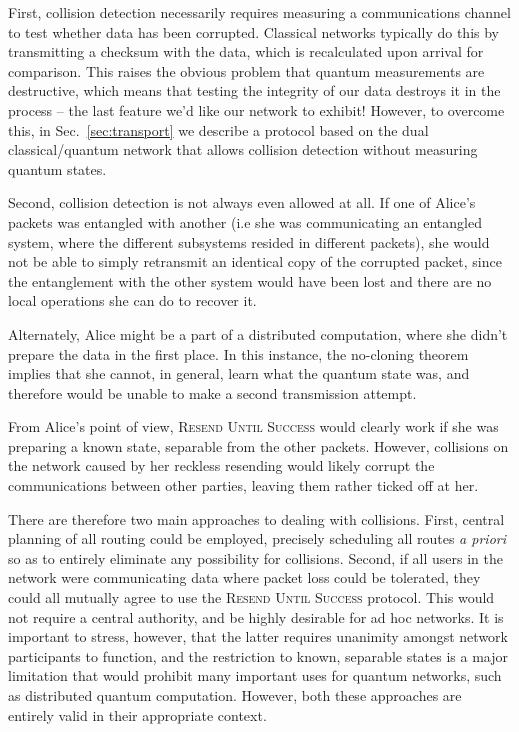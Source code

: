 \documentclass[aps, rmp, twocolumn, amsmath, amssymb, nofootinbib, superscriptaddress, longbibliography, floatfix, table-of-contents, eqsecnum]{revtex4-1}
\begin{document}
First, collision detection necessarily requires measuring a communications channel to test whether data has been corrupted. Classical networks typically do this by transmitting a checksum with the data, which is recalculated upon arrival for comparison. This raises the obvious problem that quantum measurements are destructive, which means that testing the integrity of our data destroys it in the process -- the last feature we'd like our network to exhibit! However, to overcome this, in Sec.~\ref{sec:transport} we describe a protocol based on the dual classical/quantum network that allows collision detection without measuring quantum states.

Second, collision detection is not always even allowed at all. If one of Alice's packets was entangled with another (i.e she was communicating an entangled system, where the different subsystems resided in different packets), she would not be able to simply retransmit an identical copy of the corrupted packet, since the entanglement with the other system would have been lost and there are no local operations she can do to recover it.

Alternately, Alice might be a part of a distributed computation, where she didn't prepare the data in the first place. In this instance, the no-cloning theorem implies that she cannot, in general, learn what the quantum state was, and therefore would be unable to make a second transmission attempt.

From Alice's point of view, \textsc{Resend Until Success} would clearly work if she was preparing a known state, separable from the other packets. However, collisions on the network caused by her reckless resending would likely corrupt the communications between other parties, leaving them rather ticked off at her.

There are therefore two main approaches to dealing with collisions. First, central planning of all routing could be employed, precisely scheduling all routes \textit{a priori} so as to entirely eliminate any possibility for collisions. Second, if all users in the network were communicating data where packet loss could be tolerated, they could all mutually agree to use the \textsc{Resend Until Success} protocol. This would not require a central authority, and be highly desirable for ad hoc networks. It is important to stress, however, that the latter requires unanimity amongst network participants to function, and the restriction to known, separable states is a major limitation that would prohibit many important uses for quantum networks, such as distributed quantum computation. However, both these approaches are entirely valid in their appropriate context.
\end{document}

